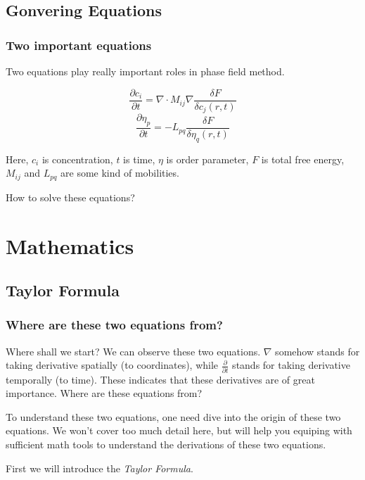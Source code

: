 \documentclass[compress]{beamer}
\begin{document}
\subsection{Gonvering Equations}
\begin{frame}
  \frametitle{Two important equations}
  Two equations play really important roles in phase field method.

  \[
    \frac{\partial c_i}{\partial t} = \nabla \cdot M_{ij} \nabla \frac{\delta F}{\delta c_j \left( r,t \right)} \tag{Cahn-Hilliard}
  \]
  \[
    \frac{\partial \eta_p}{\partial t} = -L_{pq}\frac{\delta F}{\delta\eta_q\left( r,t \right)} \tag{Allen-Cahn}
  \]

  Here, \(c_i\) is concentration, \(t\) is time, \(\eta\) is order parameter, \(F\) is total free energy,
  \(M_{ij}\) and \(L_{pq}\) are some kind of mobilities.
  \begin{center}
    {\Huge How to solve these equations?}
  \end{center}
\end{frame}

\section{Mathematics}
\subsection{Taylor Formula}
\begin{frame}
  \frametitle{Where are these two equations from?}
  Where shall we start? We can observe these two equations.
  \bigbreak
  \(\nabla\) somehow stands for taking derivative spatially (to coordinates), while \(\frac{\partial}{\partial t}\)
  stands for taking derivative temporally (to time). These indicates that these derivatives are of great importance.
  \bigbreak
  Where are these equations from?


  To understand these two equations, one need dive into the origin of these two equations. We won't cover too much detail here,
  but will help you equiping with sufficient math tools to understand the derivations of these two equations.

  First we will introduce the \emph{Taylor Formula}.
\end{frame}
\end{document}
